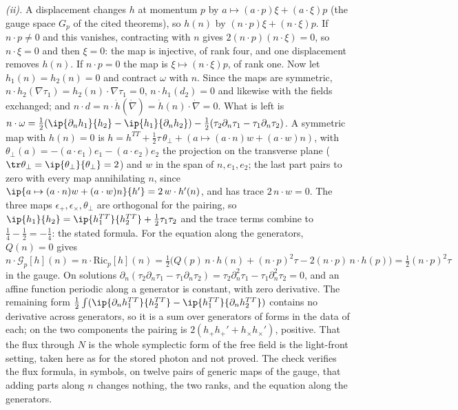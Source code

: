 \emph{(ii).} A displacement changes $h$ at momentum $p$ by $a \mapsto (a \cdot p)\xi + (a \cdot \xi)p$ (the gauge space $G_{p}$ of the cited theorems), so $h(n)$ by $(n \cdot p)\xi + (n \cdot \xi)p$. If $n \cdot p \neq 0$ and this vanishes, contracting with $n$ gives $2(n \cdot p)(n \cdot \xi) = 0$, so $n \cdot \xi = 0$ and then $\xi = 0$: the map is injective, of rank four, and one displacement removes $h(n)$. If $n \cdot p = 0$ the map is $\xi \mapsto (n \cdot \xi)p$, of rank one. Now let $h_{1}(n) = h_{2}(n) = 0$ and contract $\omega$ with $n$. Since the maps are symmetric, $n \cdot h_{2}(\nabla\tau_{1}) = h_{2}(n) \cdot \nabla\tau_{1} = 0$, $n \cdot h_{1}(d_{2}) = 0$ and likewise with the fields exchanged; and $n \cdot d = n \cdot \dot h(\dot\nabla) = \dot h(n) \cdot \dot\nabla = 0$. What is left is $n \cdot \omega = \tfrac12(\ip{\partial_{n}h_{1}}{h_{2}} - \ip{h_{1}}{\partial_{n}h_{2}}) - \tfrac12(\tau_{2}\partial_{n}\tau_{1} - \tau_{1}\partial_{n}\tau_{2})$. A symmetric map with $h(n) = 0$ is $h = h^{TT} + \tfrac12\tau\,\theta_{\perp} + (a \mapsto (a \cdot n)w + (a \cdot w)n)$, with $\theta_{\perp}(a) = -(a \cdot e_{1})e_{1} - (a \cdot e_{2})e_{2}$ the projection on the transverse plane ($\tr\theta_{\perp} = \ip{\theta_{\perp}}{\theta_{\perp}} = 2$) and $w$ in the span of $n, e_{1}, e_{2}$; the last part pairs to zero with every map annihilating $n$, since $\ip{a \mapsto (a \cdot n)w + (a \cdot w)n}{h'} = 2\,w \cdot h'(n)$, and has trace $2\,n \cdot w = 0$. The three maps $\epsilon_{+}, \epsilon_{\times}, \theta_{\perp}$ are orthogonal for the pairing, so $\ip{h_{1}}{h_{2}} = \ip{h_{1}^{TT}}{h_{2}^{TT}} + \tfrac12\tau_{1}\tau_{2}$ and the trace terms combine to $\tfrac14 - \tfrac12 = -\tfrac14$: the stated formula. For the equation along the generators, $Q(n) = 0$ gives $n \cdot \mathcal{G}_{p}[h](n) = n \cdot \mathrm{Ric}_{p}[h](n) = \tfrac12\bigl(Q(p)\,n \cdot h(n) + (n \cdot p)^{2}\tau - 2(n \cdot p)\,n \cdot h(p)\bigr) = \tfrac12(n \cdot p)^{2}\tau$ in the gauge. On solutions $\partial_{n}(\tau_{2}\partial_{n}\tau_{1} - \tau_{1}\partial_{n}\tau_{2}) = \tau_{2}\partial_{n}^{2}\tau_{1} - \tau_{1}\partial_{n}^{2}\tau_{2} = 0$, and an affine function periodic along a generator is constant, with zero derivative. The remaining form $\tfrac12\int(\ip{\partial_{n}h_{1}^{TT}}{h_{2}^{TT}} - \ip{h_{1}^{TT}}{\partial_{n}h_{2}^{TT}})$ contains no derivative across generators, so it is a sum over generators of forms in the data of each; on the two components the pairing is $2(h_{+}h_{+}' + h_{\times}h_{\times}')$, positive. That the flux through $N$ is the whole symplectic form of the free field is the light-front setting, taken here as for the stored photon and not proved. The check verifies the flux formula, in symbols, on twelve pairs of generic maps of the gauge, that adding parts along $n$ changes nothing, the two ranks, and the equation along the generators.


